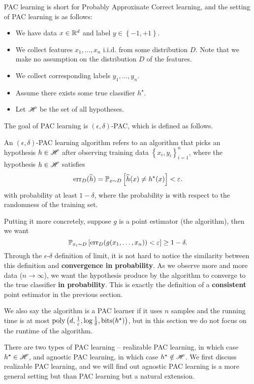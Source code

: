 \documentclass[a4paper]{article}
\begin{document}
PAC learning is short for Probably Approxinate Correct 
learning, and the setting of PAC learning is as follows:
\begin{itemize}
  \item We have data $x \in \mathbb{R}^d$ and label $y \in \left\{ -1, 
  +1 \right\}$. 
  \item We collect features $x_1, \dots, x_n$ i.i.d. from 
  some distribution $D$. Note that we make no assumption on 
  the distribution $D$ of the features. 
  \item We collect corresponding labels $y_1, \dots, y_n$. 
  \item Assume there exists some true classifier $h^\star$.
  \item Let $\mathscr{H}$ be the set of all hypotheses.
\end{itemize}
The goal of PAC learning is $(\epsilon, \delta)$-PAC, 
which is defined as follows. 
\begin{defi}
  An $(\epsilon, \delta)$-PAC learning algorithm
  refers to an algorithm that 
  picks an hypothesis $h \in \mathscr{H}$  
  after observing training data 
  $\left\{ x_i, y_i \right\}_{i=1}^n$,
  where the hypothesis $h \in \mathscr{H}$ satisfies
  \[
  \operatorname{err}_D (\widehat{h}) = 
  \mathbb{P}_{x \sim D} \left[ \widehat{h}(x) \neq h^\star(x) \right]
  < \varepsilon.
  \]
  with probability at least $1 - \delta$, where the probability
  is with respect to the randomness of the training set.
\end{defi}
Putting it more concretely, suppose $g$ is a point estimator
(the algorithm), then we want 
\[
\mathbb{P}_{x_i \sim D} \left[ \operatorname{err}_D (g(x_1, \dots, x_n)) < \varepsilon 
\right] \geq 1 - \delta.
\]
Through the $\epsilon$-$\delta$ definition of limit, 
it is not hard to  
notice the similarity between this definition 
and \textbf{convergence in probability}.
As we observe more and more data ($n \to \infty$), 
we want the hypothesis 
produce by the algorithm to converge to the true classifier
\textbf{in probability}. This is exactly the definition 
of a \textbf{consistent} point estimator in the previous 
section.

We also say the algorithm is a PAC learner if it uses 
$n$ samples and the running time is at most $\operatorname{poly}
\left( d, \frac{1}{\varepsilon}, \log \frac{1}{\delta}, 
\operatorname{bits}(h^\star) \right)$, but in this section we do not 
focus on the runtime of the algorithm.

There are two types of PAC learning -- realizable PAC learning,
in which case $h^\star \in \mathscr{H}$, and agnostic PAC learning, 
in which case $h^\star \notin \mathscr{H}$. We first discuss 
realizable PAC learning, and we will find out agnostic PAC 
learning is a more general setting but than PAC learning
but a natural extension. 
\end{document}
